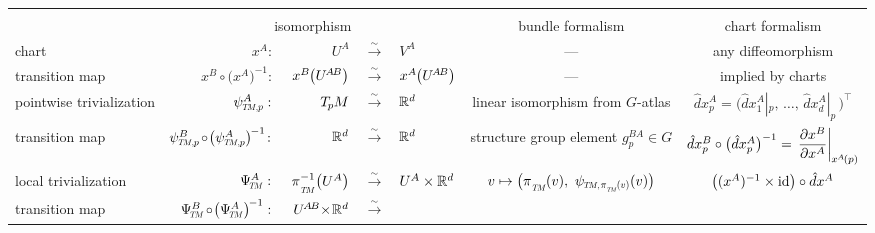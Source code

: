 

\def\arraystretch{2.75}%
\setlength\tabcolsep{2.8ex}
\small
\begin{tabular}{ @{\ \ } l r@{\,}r@{\ }c@{\ }l cc @{\ \ } } 
    \toprule 
    \\[-8.0ex]
    & \multicolumn{4}{c}{isomorphism}
    & bundle formalism
    & chart formalism \\
    \midrule[0.07em] %
    chart
        & $x^A :\ $
        & $U^A$
        & $\xrightarrow{\sim}$
        & $V^A$
        & ---
        & any diffeomorphism
    \\
    transition map
        & $x^B \!\circ\! \big(x^A\big)^{-1} :\ $
        & $x^B \mkern-1mu\big( U^{\mkern-2muA\mkern-2muB} \big)$
        & $\xrightarrow{\sim}$
        & $x^A \mkern-1mu\big( U^{\mkern-2muA\mkern-2muB} \big)$
        & ---
        & implied by charts
    \\
    \midrule[0.04em] %
    pointwise trivialization \hspace*{-3ex}
        & $\psiTMp^A :\ $
        & $T_{\mkern-1.5mu p}\mkern-.5muM$
        & $\xrightarrow{\sim}$
        & $\mathbb{R}^d$
        & linear isomorphism from $G$-atlas
        & $\hat{d}x^A_p = \big( \hat{d}x^A_1|_p,\, \dots,\, \hat{d}x^A_d|_p\, \big)^{\!\top}$
    \\
    transition map
        & $\psiTMp^B \mkern-2mu\circ\! \big(\psiTMp^A\big)^{\mkern-2mu-1} \!:\ $
        & $\mathbb{R}^d$
        & $\xrightarrow{\sim}$
        & $\mathbb{R}^d$
        & structure group element $g_p^{BA} \in G$
        & $\hat{d}x^B_p \circ \big(\hat{d}x^A_p\big)^{-1}
           =\, \displaystyle \frac{\partial x^B}{\partial x^A} \bigg|_{\mkern-1mu x^{\mkern-1mu A}\mkern-2mu(p)} $
    \\
    \midrule[0.04em] %
    local trivialization
        & $\PsiTM^A :\ $
        & $\piTM^{-1} \big(U^A\big)$
        & $\xrightarrow{\sim}$
        & $U^A \times \mathbb{R}^d$
        & $v \mapsto \big( \piTM\mkern-1mu(v),\ \psiTMpiv(v) \big)$
        & $\big((x^A)^{-1} \times \mathrm{id}\big) \circ \hat{d}x^A$
    \\
    transition map
        & $\PsiTM^B \mkern-2mu\circ\! \big(\PsiTM^A\big)^{\mkern-2mu-1} :\ $
        & $U^{\mkern-2muA\mkern-2muB} \mkern-4mu\times\! \mathbb{R}^d$
        & $\xrightarrow{\sim}$

\end{tabular}
